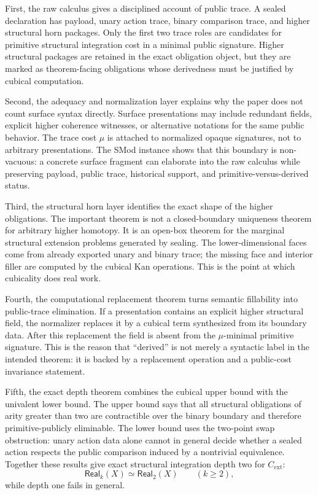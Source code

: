 First, the raw calculus gives a disciplined account of public trace.  A sealed declaration has
payload, unary action trace, binary comparison trace, and higher structural horn packages.
Only the first two trace roles are candidates for primitive structural integration cost in a
minimal public signature.  Higher structural packages are retained in the exact obligation
object, but they are marked as theorem-facing obligations whose derivedness must be justified
by cubical computation.

Second, the adequacy and normalization layer explains why the paper does not count surface
syntax directly.  Surface presentations may include redundant fields, explicit higher
coherence witnesses, or alternative notations for the same public behavior.  The trace cost
\(\mu\) is attached to normalized opaque signatures, not to arbitrary presentations.  The SMod
instance shows that this boundary is non-vacuous: a concrete surface fragment can elaborate
into the raw calculus while preserving payload, public trace, historical support, and
primitive-versus-derived status.

Third, the structural horn layer identifies the exact shape of the higher obligations.  The
important theorem is not a closed-boundary uniqueness theorem for arbitrary higher homotopy.
It is an open-box theorem for the marginal structural extension problems generated by sealing.
The lower-dimensional faces come from already exported unary and binary trace; the missing
face and interior filler are computed by the cubical Kan operations.  This is the point at
which cubicality does real work.

Fourth, the computational replacement theorem turns semantic fillability into public-trace
elimination.  If a presentation contains an explicit higher structural field, the normalizer
replaces it by a cubical term synthesized from its boundary data.  After this replacement the
field is absent from the \(\mu\)-minimal primitive signature.  This is the reason that
``derived'' is not merely a syntactic label in the intended theorem: it is backed by a
replacement operation and a public-cost invariance statement.

Fifth, the exact depth theorem combines the cubical upper bound with the univalent lower
bound.  The upper bound says that all structural obligations of arity greater than two are
contractible over the binary boundary and therefore primitive-publicly eliminable.  The lower
bound uses the two-point swap obstruction: unary action data alone cannot in general decide
whether a sealed action respects the public comparison induced by a nontrivial equivalence.
Together these results give exact structural integration depth two for \(C_{\mathrm{ext}}\):
\[
  \mathsf{Real}_k(X) \simeq \mathsf{Real}_2(X)
  \qquad (k \geq 2),
\]
while depth one fails in general.

